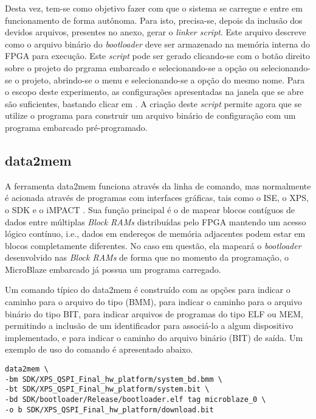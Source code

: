 \documentclass[11pt,a4paper,oneside]{book}
\begin{document}
Desta vez, tem-se como objetivo fazer com que o sistema se carregue e entre em funcionamento de forma autônoma.
Para isto, precisa-se, depois da inclusão dos devidos arquivos, presentes no anexo, gerar o \textit{linker script}.
Este arquivo descreve como o arquivo binário do \textit{bootloader} deve ser armazenado na memória interna do FPGA para execução.
Este \textit{script} pode ser gerado clicando-se com o botão direito sobre o projeto do prgrama embarcado e selecionando-se a opção  ou selecionando-se o projeto, abrindo-se o menu  e selecionando-se a opção do mesmo nome.
Para o escopo deste experimento, as configurações apresentadas na janela que se abre são suficientes, bastando clicar em .
A criação deste \textit{script} permite agora que se utilize o programa  para construir um arquivo binário de configuração com um programa embarcado pré-programado.

\subsection{data2mem}
A ferramenta data2mem funciona através da linha de comando, mas normalmente é acionada através de programas com interfaces gráficas, tais como o ISE, o XPS, o SDK e o iMPACT \cite{ug658}.
Sua função principal é o de mapear blocos contíguos de dados entre múltiplas \textit{Block RAMs} distribuídas pelo FPGA mantendo um acesso lógico contínuo, i.e., dados em endereços de memória adjacentes podem estar em blocos completamente diferentes.
No caso em questão, ela mapeará o \textit{bootloader} desenvolvido nas \textit{Block RAMs} de forma que no momento da programação, o MicroBlaze embarcado já possua um programa carregado.

Um comando típico do data2mem é construído com as opções  para indicar o caminho para o arquivo do tipo  (BMM),  para indicar o caminho para o arquivo binário do tipo BIT,  para indicar arquivos de programas do tipo ELF ou MEM, permitindo a inclusão de um identificador para associá-lo a algum dispositivo implementado, e  para indicar o caminho do arquivo binário (BIT) de saída.
Um exemplo de uso do comando é apresentado abaixo.
\begin{lstlisting}[style=customVHDL]
data2mem \
-bm SDK/XPS_QSPI_Final_hw_platform/system_bd.bmm \
-bt SDK/XPS_QSPI_Final_hw_platform/system.bit \
-bd SDK/bootloader/Release/bootloader.elf tag microblaze_0 \
-o b SDK/XPS_QSPI_Final_hw_platform/download.bit
\end{lstlisting}
\end{document}
